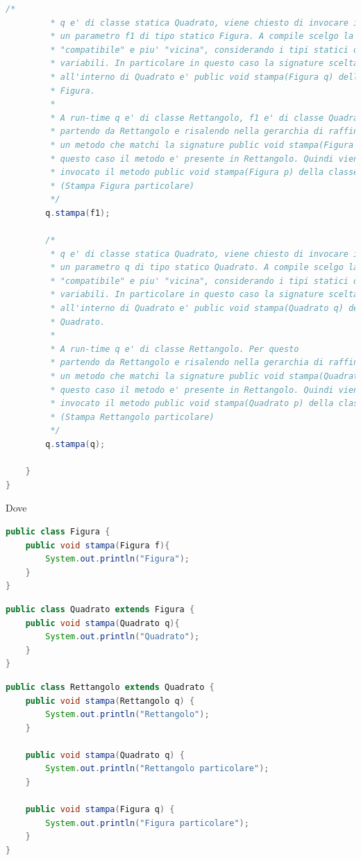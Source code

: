 \documentclass{article}
\begin{document}
\begin{lstlisting}[language=Java,escapechar=|]
		/*
		 * q e' di classe statica Quadrato, viene chiesto di invocare il metodo stampa su
		 * un parametro f1 di tipo statico Figura. A compile scelgo la signature
		 * "compatibile" e piu' "vicina", considerando i tipi statici delle
		 * variabili. In particolare in questo caso la signature scelta
		 * all'interno di Quadrato e' public void stampa(Figura q) della classe
		 * Figura.
		 * 
		 * A run-time q e' di classe Rettangolo, f1 e' di classe Quadrato. Per questo
		 * partendo da Rettangolo e risalendo nella gerarchia di raffinamento cerco
		 * un metodo che matchi la signature public void stampa(Figura p). In
		 * questo caso il metodo e' presente in Rettangolo. Quindi viene
		 * invocato il metodo public void stampa(Figura p) della classe Rettangolo
		 * (Stampa Figura particolare)
		 */
		q.stampa(f1);
		
		/*
		 * q e' di classe statica Quadrato, viene chiesto di invocare il metodo stampa su
		 * un parametro q di tipo statico Quadrato. A compile scelgo la signature
		 * "compatibile" e piu' "vicina", considerando i tipi statici delle
		 * variabili. In particolare in questo caso la signature scelta
		 * all'interno di Quadrato e' public void stampa(Quadrato q) della classe
		 * Quadrato.
		 * 
		 * A run-time q e' di classe Rettangolo. Per questo
		 * partendo da Rettangolo e risalendo nella gerarchia di raffinamento cerco
		 * un metodo che matchi la signature public void stampa(Quadrato p). In
		 * questo caso il metodo e' presente in Rettangolo. Quindi viene
		 * invocato il metodo public void stampa(Quadrato p) della classe Rettangolo
		 * (Stampa Rettangolo particolare)
		 */
		q.stampa(q);

	}
}
\end{lstlisting}

Dove
\begin{lstlisting}[language=Java,escapechar=|]
public class Figura {
	public void stampa(Figura f){
		System.out.println("Figura");
	}
}
\end{lstlisting}
\begin{lstlisting}[language=Java,escapechar=|]
public class Quadrato extends Figura {
	public void stampa(Quadrato q){
		System.out.println("Quadrato");
	}
}
\end{lstlisting}
\begin{lstlisting}[language=Java,escapechar=|]
public class Rettangolo extends Quadrato {
	public void stampa(Rettangolo q) {
		System.out.println("Rettangolo");
	}

	public void stampa(Quadrato q) {
		System.out.println("Rettangolo particolare");
	}

	public void stampa(Figura q) {
		System.out.println("Figura particolare");
	}
}
\end{lstlisting}
\end{document}
